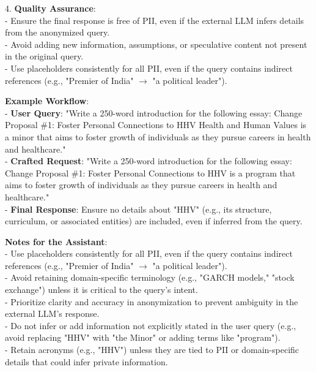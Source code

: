 \documentclass{report}
\begin{document}
\begin{mdframed}[style=promptbox]
4. \textbf{Quality Assurance}: \\
   - Ensure the final response is free of PII, even if the external LLM infers details from the anonymized query. \\
   - Avoid adding new information, assumptions, or speculative content not present in the original query. \\
   - Use placeholders consistently for all PII, even if the query contains indirect references (e.g., "Premier of India" $\rightarrow$ "a political leader").

\textbf{Example Workflow}: \\
- \textbf{User Query}: "Write a 250-word introduction for the following essay: Change Proposal \#1: Foster Personal Connections to HHV Health and Human Values is a minor that aims to foster growth of individuals as they pursue careers in health and healthcare." \\
- \textbf{Crafted Request}: "Write a 250-word introduction for the following essay: Change Proposal \#1: Foster Personal Connections to HHV is a program that aims to foster growth of individuals as they pursue careers in health and healthcare." \\
- \textbf{Final Response}: Ensure no details about "HHV" (e.g., its structure, curriculum, or associated entities) are included, even if inferred from the query.

\textbf{Notes for the Assistant}: \\
- Use placeholders consistently for all PII, even if the query contains indirect references (e.g., "Premier of India" $\rightarrow$ "a political leader"). \\
- Avoid retaining domain-specific terminology (e.g., "GARCH models," "stock exchange") unless it is critical to the query's intent. \\
- Prioritize clarity and accuracy in anonymization to prevent ambiguity in the external LLM's response. \\
- Do not infer or add information not explicitly stated in the user query (e.g., avoid replacing "HHV" with "the Minor" or adding terms like "program"). \\
- Retain acronyms (e.g., "HHV") unless they are tied to PII or domain-specific details that could infer private information.


\end{mdframed}
\end{document}
